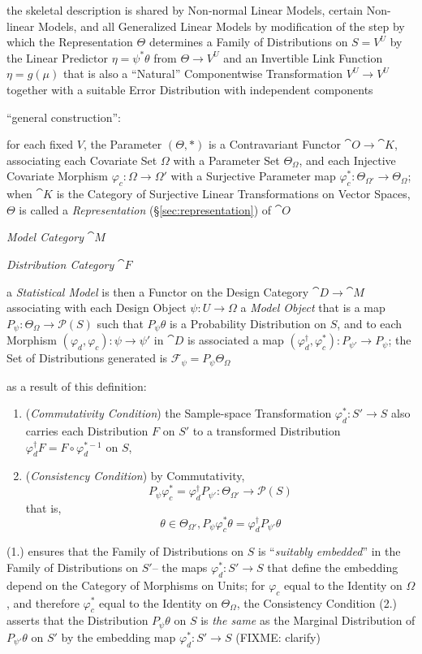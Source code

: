 the skeletal description is shared by Non-normal Linear Models, certain
Non-linear Models, and all Generalized Linear Models by modification of the step
by which the Representation $\Theta$ determines a Family of Distributions on
$S = V^U$ by the Linear Predictor $\eta = \psi^*\theta$ from $\Theta \to V^U$
and an Invertible Link Function $\eta = g(\mu)$ that is also a ``Natural''
Componentwise Transformation $V^U \to V^U$ together with a suitable Error
Distribution with independent components

``general construction'':

for each fixed $V$, the Parameter $(\Theta, *)$ is a Contravariant Functor
$\cat{O} \to \cat{K}$, associating each Covariate Set $\Omega$ with a Parameter
Set $\Theta_\Omega$, and each Injective Covariate Morphism
$\varphi_c : \Omega \to \Omega'$ with a Surjective Parameter map
$\varphi_c^* : \Theta_{\Omega'} \to \Theta_\Omega$; when $\cat{K}$ is the
Category of Surjective Linear Transformations on Vector Spaces, $\Theta$ is
called a \emph{Representation} (\S\ref{sec:representation}) of $\cat{O}$

\emph{Model Category} $\cat{M}$

\emph{Distribution Category} $\cat{F}$

a \emph{Statistical Model} is then a Functor on the Design Category
$\cat{D} \to \cat{M}$ associating with each Design Object $\psi : U \to \Omega$
a \emph{Model Object} that is a map $P_\psi : \Theta_\Omega \to \mathcal{P}(S)$
such that $P_\psi\theta$ is a Probability Distribution on $S$, and to each
Morphism $(\varphi_d,\varphi_c) : \psi \to \psi'$ in $\cat{D}$ is associated a
map $(\varphi_d^\dagger, \varphi_c^*) : P_{\psi'} \to P_\psi$; the Set of
Distributions generated is $\mathcal{F}_\psi = P_\psi \Theta_\Omega$

as a result of this definition:
\begin{enumerate}
  \item (\emph{Commutativity Condition}) the Sample-space Transformation
    $\varphi_d^* : S' \to S$ also carries each Distribution $F$ on $S'$ to a
    transformed Distribution $\varphi_d^\dagger F = F \circ \varphi^{*-1}_d$ on
    $S$,
  \item (\emph{Consistency Condition}) by Commutativity,
    \[
      P_\psi\varphi_c^* =
        \varphi_d^\dagger P_{\psi'} : \Theta_{\Omega'} \to \mathcal{P}(S)
    \]
    that is,
    \[
      \theta \in \Theta_{\Omega'}, P_\psi \varphi_c^* \theta =
        \varphi_d^\dagger P_{\psi'} \theta
    \]
\end{enumerate}
(1.) ensures that the Family of Distributions on $S$ is ``\emph{suitably
embedded}'' in the Family of Distributions on $S'$-- the maps
$\varphi_d^* : S' \to S$ that define the embedding depend on the Category of
Morphisms on Units; for $\varphi_c$ equal to the Identity on $\Omega$, and
therefore $\varphi_c^*$ equal to the Identity on $\Theta_\Omega$, the
Consistency Condition (2.) asserts that the Distribution $P_\psi\theta$ on
$S$ is \emph{the same} as the Marginal Distribution of $P_{\psi'}\theta$ on $S'$
by the embedding map $\varphi_d^* : S' \to S$ (FIXME: clarify)

